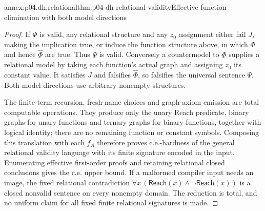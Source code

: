 \begin{annexitem}{annex:p04.dh.relational}{thm:p04-dh-relational-validity}{Effective function elimination with both model directions}
\begin{proof}
If \(\Phi\) is valid, any relational structure and any \(z_0\) assignment
either fail \(J\), making the implication true, or induce the function
structure above, in which \(\Phi\) and hence \(\widehat\Phi\) are true.
Thus \(\Psi\) is valid. Conversely a countermodel to \(\Phi\) supplies
a relational model by taking each function's actual graph and assigning
\(z_0\) its constant value. It satisfies \(J\) and falsifies
\(\widehat\Phi\), so falsifies the universal sentence \(\Psi\).
Both model directions use arbitrary nonempty structures.

The finite term recursion, fresh-name choices and graph-axiom emission
are total computable operations. They produce only the unary Reach
predicate, binary graphs for unary functions and ternary graphs for
binary functions, together with logical identity; there are no remaining
function or constant symbols. Composing this translation with each
\(f_A\) therefore proves c.e.-hardness of the general relational validity
language with its finite signature encoded in the input. Enumerating
effective first-order proofs and retaining relational closed conclusions
gives the c.e. upper bound. If a malformed compiler input needs an image,
the fixed relational contradiction
\(\forall x\,(\mathsf{Reach}(x)\land\neg\mathsf{Reach}(x))\) is a closed
nonvalid sentence on every nonempty domain. The reduction is total,
and no uniform claim for all fixed finite relational signatures is made.
\end{proof}
\end{annexitem}
